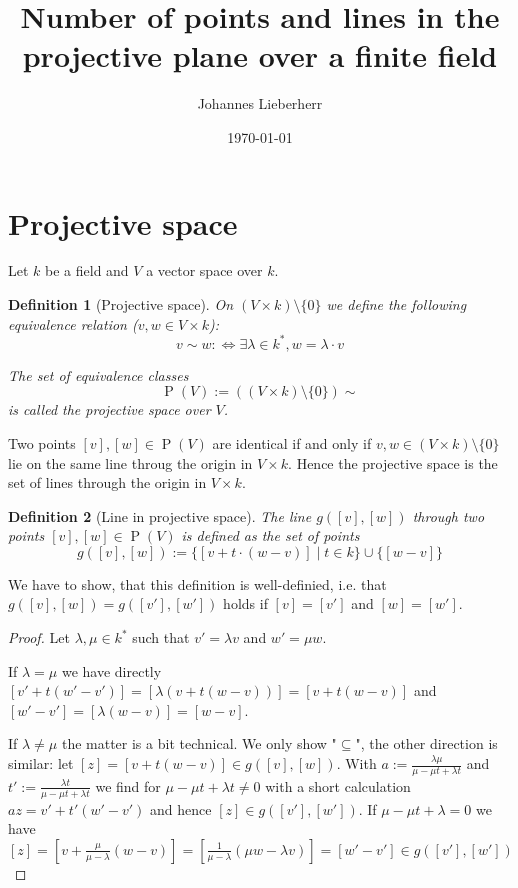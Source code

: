 \documentclass{article}
\title{Number of points and lines in the projective plane over a finite field}
\author{Johannes Lieberherr}
\date{\today}
\newtheorem{definition}{Definition}
\begin{document}
	\maketitle
	\section{Projective space}
	Let $k$ be a field and $V$ a vector space over $k$.
	
	\begin{definition}[Projective space]
		On $(V\times k)\setminus \{0\}$ we define the following equivalence relation ($v, w \in V\times k$):
		$$v\sim w :\iff \exists \lambda \in k^*, w = \lambda \cdot v$$
		
		The set of equivalence classes
		$$\operatorname{P}(V):=((V\times k)\setminus \{0\})\sim$$
		is called the projective space over $V$.
	\end{definition}

	Two points $[v],[w]\in\operatorname{P}(V)$ are identical if and only if $v, w\in (V\times k)\setminus \{0\}$ lie on the same line throug the origin in $V\times k$. Hence the projective space is the set of lines through the origin in $V\times k$.
	
	\begin{definition}[Line in projective space]
		The line $g([v],[w])$ through two points  $[v],[w]\in\operatorname{P}(V)$ is defined as the set of points
		$$g([v],[w]):=\{[v+t\cdot (w-v) ] \mid t\in k\} \cup \{[w-v]\}$$	
	\end{definition}
	We have to show, that this definition is well-definied, i.e. that $g([v],[w])=g([v'],[w'])$ holds if $[v]=[v']$ and $[w]=[w']$.
	\begin{proof}
		Let $\lambda, \mu \in k^*$ such that $v'=\lambda v$ and $w'=\mu w$.
		
		If $\lambda=\mu$ we have directly $[v'+t(w'-v')]=[\lambda (v+t(w-v))]=[v+t(w-v)]$ and $[w'-v']=[\lambda(w-v)]=[w-v]$.
		
		If $\lambda \neq \mu$ the matter is a bit technical. We only show "$\subseteq$", the other direction is similar: let $[z]=[v+t(w-v)]\in g([v], [w])$. With $a:=\frac{\lambda \mu}{\mu-\mu t+\lambda t}$ and $t':=\frac{\lambda t}{\mu-\mu t + \lambda t}$ we find for $\mu-\mu t + \lambda t\neq 0$ with a short calculation $a z = v'+t'(w'-v')$ and hence $[z]\in g([v'], [w'])$. If $\mu-\mu t + \lambda = 0$ we have $[z]=[v+\frac{\mu}{\mu-\lambda}(w-v)]=[\frac{1}{\mu - \lambda}(\mu w - \lambda v)]=[w'-v']\in g([v'], [w'])$
	\end{proof}
\end{document}
